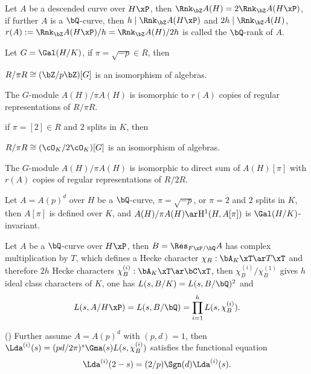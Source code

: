 \documentclass[a4paper, twoside]{article}
\begin{document}
\begin{thm}
	Let $A$ be a descended curve over $H\xP$, then $\Rnk_{\bZ}A(H)=2\Rnk_{\bZ}A(H\xP)$, if further $A$ is a $\bQ$-curve, then $h\mid \Rnk_{\bZ}A(H\xP)$ and $2h\mid \Rnk_{\bZ}A(H)$, $r(A):=\Rnk_{\bZ}A(H\xP)/h=\Rnk_{\bZ}A(H)/2h$ is called the $\bQ$-rank of $A$.
\end{thm}


\begin{thm}
	Let $G=\Gal(H/K)$, if $\pi=\sqrt{-p}\in R$, then
	\begin{itm}
		\item $R/\pi R\cong(\bZ/p\bZ)[G]$ is an isomorphism of algebras.
		\item The $G$-module $A(H)/\pi A(H)$ is isomorphic to $r(A)$ copies of regular representations of $R/\pi R$.
	\end{itm}
	if $\pi=[2]\in R$ and $2$ splits in $K$, then
	\begin{itm}
		\item $R/\pi R\cong(\cO_{K}/2\cO_{K})[G]$ is an isomorphism of algebras.
		\item The $G$-module $A(H)/\pi A(H)$ is isomorphic to direct sum of $A(H)[\pi]$ with $r(A)$ copies of regular representations of $R/2R$.
	\end{itm}
\end{thm}

\begin{thm}
	Let $A=A(p)^{d}$ over $H$ be a $\bQ$-curve, $\pi=\sqrt{-p}$, or $\pi=2$ and $2$ splits in $K$, then $A[\pi]$ is defined over $K$, and $A(H)/\pi A(H)\ar \mathrm{H}_{}^{1}(H,A[\pi])$ is $\Gal(H/K)$-invariant.
\end{thm}

\begin{thm}
	Let $A$ be a $\bQ$-curve over $H\xP$, then $B=\Res_{F\xP/\bQ}A$ has complex multiplication by $T$, which defines a Hecke character $\chi_{B}:\bA_{K}\xT\ar T\xT$ and therefore $2h$ Hecke characters $\chi_{B}^{(i)}:\bA_{K}\xT\ar\bC\xT$, then $\chi_{B}^{(i)}/\chi_{B}^{(1)}$ gives $h$ ideal class characters of $K$, one has $L(s,B/K)=L(s,B/\bQ)^{2}$ and
	\[
		L(s,A/H\xP)=L(s,B/\bQ)=\prod_{i=1}^{h}L(s,\chi_{B}^{(i)}).
	\]

	(\cite[Section~19]{Gross1980}) Further assume $A=A(p)^{d}$ with $(p,d)=1$, then $\Lda^{(i)}(s)=(pd/2\pi)^{s}\Gma(s)L(s,\chi_{B}^{(i)})$ satisfies the functional equation
	\[
		\Lda^{(i)}(2-s)=(2/p)\Sgn(d)\Lda^{(i)}(s).
	\]
\end{thm}
\end{document}
